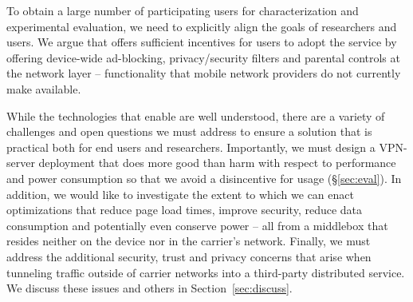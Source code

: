 
To obtain a large number of participating users for characterization 
and experimental evaluation, we need 
to explicitly align the goals of researchers and users. We argue that 
\meddle offers sufficient incentives for users to adopt the service by 
offering device-wide ad-blocking, privacy/security filters 
and parental controls at the network layer -- functionality that mobile 
network providers do not currently make available.  


While the technologies that enable \meddle are well understood, there 
are a variety of challenges and open questions we must address to ensure a solution 
that is practical both for end users and researchers. Importantly, we 
must design a VPN-server deployment that does more good than harm 
with respect to performance and power consumption so that we avoid a disincentive for usage (\S\ref{sec:eval}). In addition, we 
would like to investigate the extent to which we can enact optimizations that 
reduce page load times, improve security, reduce data consumption and potentially 
even conserve power -- all from a middlebox that resides neither on the 
device nor in the carrier's network. Finally, we must address the additional 
security, trust and privacy concerns that arise when tunneling traffic outside 
of carrier networks into a third-party distributed service. We discuss these issues and others 
in Section~\ref{sec:discuss}.


